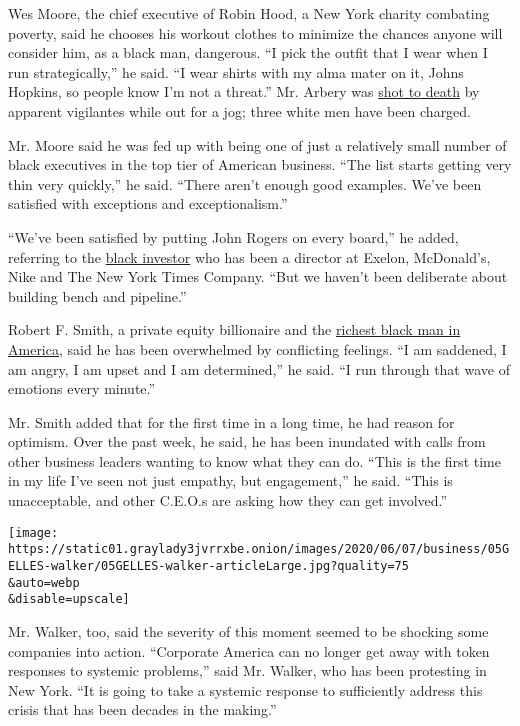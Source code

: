 Wes Moore, the chief executive of Robin Hood, a New York charity
combating poverty, said he chooses his workout clothes to minimize the
chances anyone will consider him, as a black man, dangerous. ``I pick
the outfit that I wear when I run strategically,'' he said. ``I wear
shirts with my alma mater on it, Johns Hopkins, so people know I'm not a
threat.'' Mr. Arbery was
\href{https://www.nytimes3xbfgragh.onion/article/ahmaud-arbery-shooting-georgia.html}{shot
to death} by apparent vigilantes while out for a jog; three white men
have been charged.

Mr. Moore said he was fed up with being one of just a relatively small
number of black executives in the top tier of American business. ``The
list starts getting very thin very quickly,'' he said. ``There aren't
enough good examples. We've been satisfied with exceptions and
exceptionalism.''

``We've been satisfied by putting John Rogers on every board,'' he
added, referring to the
\href{https://www.arielinvestments.com/content/view/112/1062/}{black
investor} who has been a director at Exelon, McDonald's, Nike and The
New York Times Company. ``But we haven't been deliberate about building
bench and pipeline.''

Robert F. Smith, a private equity billionaire and the
\href{https://www.nytimes3xbfgragh.onion/2019/05/19/business/robert-f-smith-morehouse-vista-equity.html}{richest
black man in America}, said he has been overwhelmed by conflicting
feelings. ``I am saddened, I am angry, I am upset and I am determined,''
he said. ``I run through that wave of emotions every minute.''

Mr. Smith added that for the first time in a long time, he had reason
for optimism. Over the past week, he said, he has been inundated with
calls from other business leaders wanting to know what they can do.
``This is the first time in my life I've seen not just empathy, but
engagement,'' he said. ``This is unacceptable, and other C.E.O.s are
asking how they can get involved.''

\texttt{[image: https://static01.graylady3jvrrxbe.onion/images/2020/06/07/business/05GELLES-walker/05GELLES-walker-articleLarge.jpg?quality=75\\\&auto=webp\\\&disable=upscale]}

Mr. Walker, too, said the severity of this moment seemed to be shocking
some companies into action. ``Corporate America can no longer get away
with token responses to systemic problems,'' said Mr. Walker, who has
been protesting in New York. ``It is going to take a systemic response
to sufficiently address this crisis that has been decades in the
making.''

